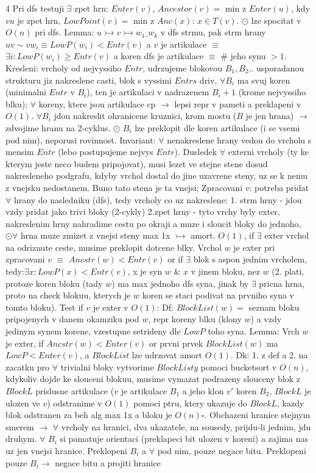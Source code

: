 \documentclass[8pt]{extarticle}
\begin{document}
\begin{multicols*}{4}
Pri dfs testuji $\exists$ zpet hrn: $Enter(v)$, $Ancestor(v)=$ min z $Enter(u)$, kdy $vu$ je zpet hrn, $LowPoint(v)=$ min z $Anc(x)$: $x\in T(v)$. $\odot$ lze spocitat v $O(n)$ pri dfs. Lemma: $u\rightarrowtail v\rightarrowtail w_1\_w_k$ v dfs strmu, pak strm hrany $uv\sim vw_i \equiv LowP(w_i)<Entr(v)$ a $v$ je artikulace $\equiv$ $\exists i: LowP(w_i)\geq Entr(v)$ a koren dfs je artikulace $\equiv$ \# jeho synu $> 1$. Kresleni: vrcholy od nejvyssiho $Entr$, udrzujeme blokovou $B_1, B_2..$ usporadanou strukturu jiz nakreslene casti, blok s vyssimi $Entrs$ driv, $\forall B_i$ ma svuj koren (minimalni $Entr$ v $B_i$), ten je artikulaci v nadrazenem $B_i+1$ (krome nejvyssiho blku); $\forall$ koreny, ktere jsou artikulace cp $\rightarrow$ lepsi repr v pameti a preklapeni v $O(1)$. $\forall B_i$ jdou nakreslit ohranicene kruznici, krom mostu ($B$ je jen hrana) $\rightarrow$ zdvojime hranu na 2-cyklus. $\odot$ $B_i$ lze preklopit dle koren artikulace (i se vsemi pod nim), neporusi rovinnost. Invariant: $\forall$ nenakreslene hrany vedou do vrcholu s mensim $Entr$ (lebo postupujeme nejvys $Entr$). Dusledek $\forall$ externi vrcholy (ty ke kterym jeste neco budem pripojovat), musi lezet ve stejne stene dosud nakresleneho podgrafu, kdyby vrchol dostal do jine uzavrene steny, uz se k nemu z vnejsku nedostanem. Buno tato stena je ta vnejsi; Zpracovani $v$: potreba pridat $\forall$ hrany do nasledniku (dfs), tedy vrcholy co uz nakreslene: 1. strm hrny - jdou vzdy pridat jako trivi bloky (2-cykly) 2.zpet hrny - tyto vrchy byly exter, nakreslenim hrny nahradime cestu po okraji a muze i sloucit bloky do jednoho, $\odot \forall$ hrna muze zmizet z vnejsi steny max 1x $\rightarrowtail$ amort. $O(1)$, if $\exists$ exter vrchol na odriznute ceste, musime preklopit dotcene blky. Vrchol $w$ je exter pri zpracovani $v$ $\equiv$ $Ancstr(w) < Entr(v)$ or if $\exists$ blok s aspon jednim vrcholem, tedy:$\exists x: LowP(x) < Entr(v)$, x je syn $w$ \& $x$ v jinem bloku, nez $w$ (2. plati, protoze koren bloku (tady $w$) ma max jednoho dfs syna, jinak by $\exists$ pricna hrna, proto na check blokuu, kterych je $w$ koren se staci podivat na prvniho syna v tomto bloku). Test if $v$ je exter v $O(1)$: Df: $BlockList(w)=$ seznam bloku pripojenych v danem okamziku pod $w$, repr koreny blku (klony $w$) a vzdy jedinym synem korene, vzestupne setrideny dle $LowP$ toho syna. Lemma: Vrch $w$ je exter, if $Ancstr(w) < Enter(v)$ or prvni prvek $BlockList(w)$ ma $LowP < Enter(v)$, a $BlockList$ lze udrzovat amort $O(1)$. Dk: 1. z def a 2. na zacatku pro $\forall$ trivialni bloky vytvorime $BlockListy$ pomoci bucketsort v $O(n)$, kdykoliv dojde ke slouceni blokuu, musime vymazat podrazeny slouceny blok z $BlockL$ prislusne artikulace ($v$ je artikulace $B_1$ a jeho klon $v'$ koren $B_2$, $BlockL$ je ulozen ve $v$) odstranime v $O(1)$ pomoci ptru, ktery ukazuje do $BlockL$, kazdy blok odstranen za beh alg max 1x a bloku je $O(n)$$\square$. Obchazeni hranice stejnym smerem $\rightarrow$ $\forall$ vrcholy na hranici, dva ukazatele, na sousedy, prijdu-li jednim, jdu druhym. $\forall$ $B_i$ si pamatuje orientaci (preklapeci bit ulozen v koreni) a zajima nas uz jen vnejsi hranice. Preklopeni $B_i$ a $\forall$ pod nim, pouze negace bitu. Preklopeni pouze $B_i \rightarrow$ negace bitu a projiti hranice 
\end{multicols*}
\end{document}
